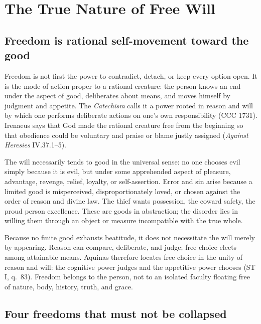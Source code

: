 \section{The True Nature of Free Will}

\subsection{Freedom is rational self-movement toward the good}

Freedom is not first the power to contradict, detach, or keep every option open. It is the mode of action proper to a rational creature: the person knows an end under the aspect of good, deliberates about means, and moves himself by judgment and appetite. The \emph{Catechism} calls it a power rooted in reason and will by which one performs deliberate actions on one's own responsibility (CCC 1731). Irenaeus says that God made the rational creature free from the beginning so that obedience could be voluntary and praise or blame justly assigned (\emph{Against Heresies} IV.37.1--5).

The will necessarily tends to good in the universal sense: no one chooses evil simply because it is evil, but under some apprehended aspect of pleasure, advantage, revenge, relief, loyalty, or self-assertion. Error and sin arise because a limited good is misperceived, disproportionately loved, or chosen against the order of reason and divine law. The thief wants possession, the coward safety, the proud person excellence. These are goods in abstraction; the disorder lies in willing them through an object or measure incompatible with the true whole.

Because no finite good exhausts beatitude, it does not necessitate the will merely by appearing. Reason can compare, deliberate, and judge; free choice elects among attainable means. Aquinas therefore locates free choice in the unity of reason and will: the cognitive power judges and the appetitive power chooses (ST I, q.~83). Freedom belongs to the person, not to an isolated faculty floating free of nature, body, history, truth, and grace.

\subsection{Four freedoms that must not be collapsed}

